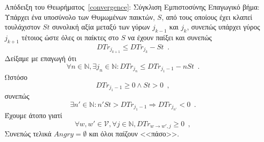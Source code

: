\begin{sepproof}{Απόδειξη του Θεωρήματος~\ref{convergence}: Σύγκλιση Εμπιστοσύνης}
  Επαγωγικό βήμα: Υπάρχει ένα υποσύνολο των Θυμωμένων παικτών, $S$, από τους οποίους έχει κλαπεί τουλάχιστον $St$ συνολική
  αξία μεταξύ των γύρων $j_{k-1}$ και $j_k$, συνεπώς υπάρχει γύρος $j_{k+1}$ τέτοιος ώστε όλες οι παίκτες στο $S$ να έχουν
  παίξει και συνεπώς
  \begin{equation*}
    DTr_{j_{k+1}} \leq DTr_{j_k} - St \enspace.
  \end{equation*}
  Δείξαμε με επαγωγή ότι
  \begin{equation*}
    \forall n \in \mathbb{N}, \exists j_n \in \mathbb{N} : DTr_{j_n} \leq DTr_{j_1-1} - nSt \enspace.
  \end{equation*}
  Ωστόσο
  \begin{equation*}
    DTr_{j_1-1} \geq 0 \wedge St > 0 \enspace,
  \end{equation*}
  συνεπώς
  \begin{equation*}
    \exists n' \in \mathbb{N} : n'St > DTr_{j_1-1} \Rightarrow DTr_{j_{n'}} < 0 \enspace.
  \end{equation*}
  Έχουμε άτοπο γιατί
  \begin{equation*}
    \forall w,w' \in \mathcal{V}, \forall j \in \mathbb{N}, DTr_{w \rightarrow w', j} \geq 0 \enspace,
  \end{equation*}
  Συνεπώς τελικά $Angry = \emptyset$ και όλοι παίζουν <<πάσο>>.
\end{sepproof}
